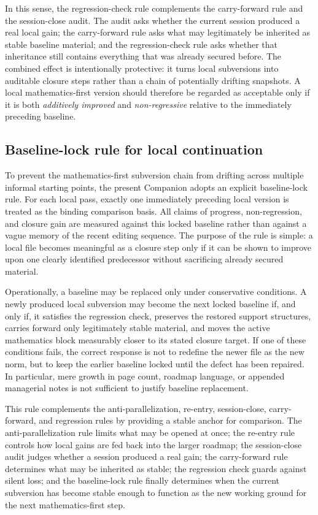 In this sense, the regression-check rule complements the carry-forward rule and the session-close audit. The audit asks whether the current session produced a real local gain; the carry-forward rule asks what may legitimately be inherited as stable baseline material; and the regression-check rule asks whether that inheritance still contains everything that was already secured before. The combined effect is intentionally protective: it turns local subversions into auditable closure steps rather than a chain of potentially drifting snapshots. A local mathematics-first version should therefore be regarded as acceptable only if it is both \emph{additively improved} and \emph{non-regressive} relative to the immediately preceding baseline.

\subsection*{Baseline-lock rule for local continuation}
To prevent the mathematics-first subversion chain from drifting across multiple informal starting points, the present Companion adopts an explicit baseline-lock rule. For each local pass, exactly one immediately preceding local version is treated as the binding comparison basis. All claims of progress, non-regression, and closure gain are measured against this locked baseline rather than against a vague memory of the recent editing sequence. The purpose of the rule is simple: a local file becomes meaningful as a closure step only if it can be shown to improve upon one clearly identified predecessor without sacrificing already secured material.

Operationally, a baseline may be replaced only under conservative conditions. A newly produced local subversion may become the next locked baseline if, and only if, it satisfies the regression check, preserves the restored support structures, carries forward only legitimately stable material, and moves the active mathematics block measurably closer to its stated closure target. If one of these conditions fails, the correct response is not to redefine the newer file as the new norm, but to keep the earlier baseline locked until the defect has been repaired. In particular, mere growth in page count, roadmap language, or appended managerial notes is not sufficient to justify baseline replacement.

This rule complements the anti-parallelization, re-entry, session-close, carry-forward, and regression rules by providing a stable anchor for comparison. The anti-parallelization rule limits what may be opened at once; the re-entry rule controls how local gains are fed back into the larger roadmap; the session-close audit judges whether a session produced a real gain; the carry-forward rule determines what may be inherited as stable; the regression check guards against silent loss; and the baseline-lock rule finally determines when the current subversion has become stable enough to function as the new working ground for the next mathematics-first step.


